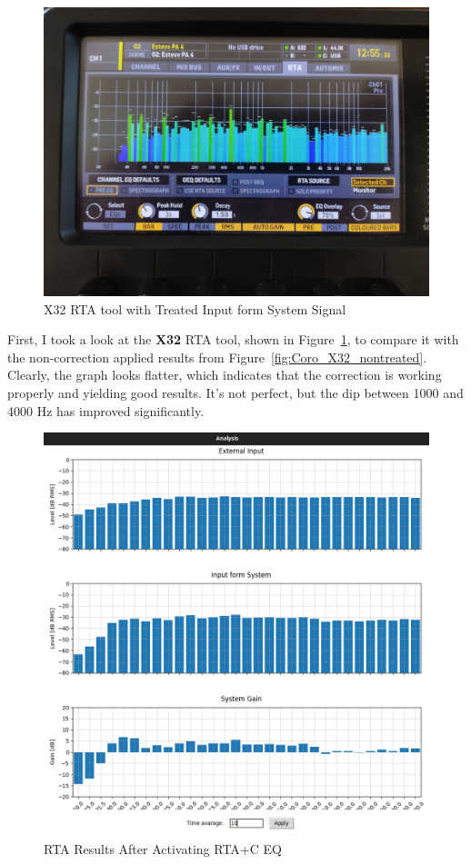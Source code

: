 \begin{figure}[H]
	\centering
	\includegraphics[width=0.8
	\linewidth]{Figures/Coro_X32_treatedRTAc.jpeg}
	\caption{X32 RTA tool with Treated Input form System Signal}
	\label{fig:Coro_X32_RTA+C}
\end{figure}

First, I took a look at the \textbf{X32} RTA tool, shown in Figure~\ref{fig:Coro_X32_RTA+C}, to compare it with the non-correction applied results from Figure~\ref{fig:Coro_X32_nontreated}. Clearly, the graph looks flatter, which indicates that the correction is working properly and yielding good results. It’s not perfect, but the dip between 1000 and 4000 Hz has improved significantly.

\begin{figure}[H]
	\centering
	\includegraphics[width=0.8
	\linewidth]{Figures/Coro_RTA+EQ_ON.png}
	\caption{RTA Results After Activating RTA+C EQ}
	\label{fig:Coro_RTA_RTA+C}
\end{figure}

